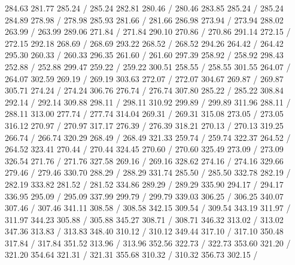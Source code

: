{ 284.63 281.77 285.24 /
 285.24 282.81 280.46 /
 280.46 283.85 285.24 /
 285.24 284.89 278.98 /
 278.98 285.93 281.66 /
 281.66 286.98 273.94 /
 273.94 288.02 263.99 /
 263.99 289.06 271.84 /
 271.84 290.10 270.86 /
 270.86 291.14 272.15 /
 272.15 292.18 268.69 /
 268.69 293.22 268.52 /
 268.52 294.26 264.42 /
 264.42 295.30 260.33 /
 260.33 296.35 261.60 /
 261.60 297.39 258.92 /
 258.92 298.43 252.88 /
 252.88 299.47 259.22 /
 259.22 300.51 258.55 /
 258.55 301.55 264.07 /
 264.07 302.59 269.19 /
 269.19 303.63 272.07 /
 272.07 304.67 269.87 /
 269.87 305.71 274.24 /
 274.24 306.76 276.74 /
 276.74 307.80 285.22 /
 285.22 308.84 292.14 /
 292.14 309.88 298.11 /
 298.11 310.92 299.89 /
 299.89 311.96 288.11 /
 288.11 313.00 277.74 /
 277.74 314.04 269.31 /
 269.31 315.08 273.05 /
 273.05 316.12 270.97 /
 270.97 317.17 276.39 /
 276.39 318.21 270.13 /
 270.13 319.25 266.74 /
 266.74 320.29 268.49 /
 268.49 321.33 259.74 /
 259.74 322.37 264.52 /
 264.52 323.41 270.44 /
 270.44 324.45 270.60 /
 270.60 325.49 273.09 /
 273.09 326.54 271.76 /
 271.76 327.58 269.16 /
 269.16 328.62 274.16 /
 274.16 329.66 279.46 /
 279.46 330.70 288.29 /
 288.29 331.74 285.50 /
 285.50 332.78 282.19 /
 282.19 333.82 281.52 /
 281.52 334.86 289.29 /
 289.29 335.90 294.17 /
 294.17 336.95 295.09 /
 295.09 337.99 299.79 /
 299.79 339.03 306.25 /
 306.25 340.07 307.46 /
 307.46 341.11 308.58 /
 308.58 342.15 309.54 /
 309.54 343.19 311.97 /
 311.97 344.23 305.88 /
 305.88 345.27 308.71 /
 308.71 346.32 313.02 /
 313.02 347.36 313.83 /
 313.83 348.40 310.12 /
 310.12 349.44 317.10 /
 317.10 350.48 317.84 /
 317.84 351.52 313.96 /
 313.96 352.56 322.73 /
 322.73 353.60 321.20 /
 321.20 354.64 321.31 /
 321.31 355.68 310.32 /
 310.32 356.73 302.15 /
}
